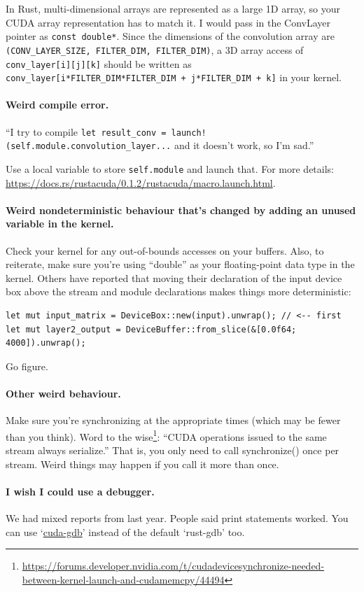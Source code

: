 In Rust, multi-dimensional arrays are represented as a large 1D array, so your CUDA array representation has to match it. I would pass in the ConvLayer pointer as \texttt{const double*}. Since the dimensions of the convolution array are \texttt{(CONV\_LAYER\_SIZE, FILTER\_DIM, FILTER\_DIM)}, a 3D array access of \texttt{conv\_layer[i][j][k]} should be written as \texttt{conv\_layer[i*FILTER\_DIM*FILTER\_DIM + j*FILTER\_DIM + k]} in your kernel.

\paragraph{Weird compile error.} ``I try to compile \verb+let result_conv = launch!(self.module.convolution_layer...+ and it doesn't work, so I'm sad.''

Use a local variable to store \texttt{self.module} and launch that. For more details: \url{https://docs.rs/rustacuda/0.1.2/rustacuda/macro.launch.html}.

\paragraph{Weird nondeterministic behaviour that's changed by adding an unused variable in the kernel.} Check your kernel for any out-of-bounds accesses on your buffers. Also, to reiterate, make sure you're using ``double'' as your floating-point data type in the kernel. Others have reported that moving their declaration of the input device box above the stream and module declarations makes things more deterministic:
\begin{verbatim}
let mut input_matrix = DeviceBox::new(input).unwrap(); // <-- first
let mut layer2_output = DeviceBuffer::from_slice(&[0.0f64; 4000]).unwrap();
\end{verbatim}
Go figure.

\paragraph{Other weird behaviour.} Make sure you're synchronizing at the appropriate times (which may be fewer than you think). Word to the wise\footnote{\url{https://forums.developer.nvidia.com/t/cudadevicesynchronize-needed-between-kernel-launch-and-cudamemcpy/44494}}: ``CUDA operations issued to the same stream always serialize.'' That is, you only need to call synchronize() once per stream. Weird things may happen if you call it more than once.

\paragraph{I wish I could use a debugger.} We had mixed reports from last year. People said print statements worked. You can use `\href{https://docs.nvidia.com/cuda/cuda-gdb/index.html}{cuda-gdb}' instead of the default `rust-gdb' too.

